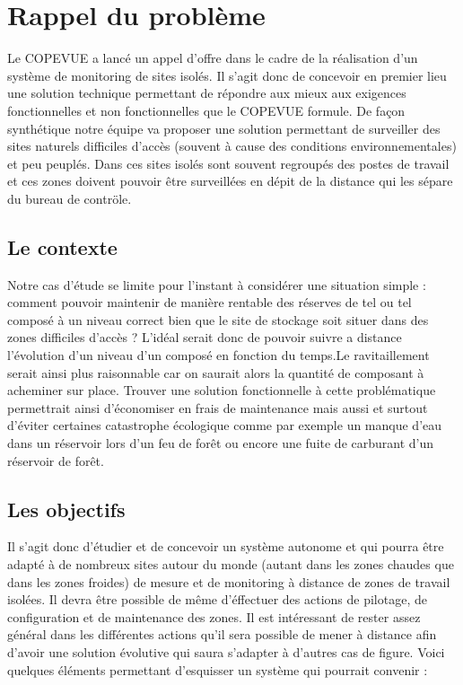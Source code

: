 \section{Rappel du problème}
Le COPEVUE a lancé un appel d'offre dans le cadre de la réalisation d'un système de monitoring de sites isolés. Il s'agit donc de concevoir en premier lieu une solution technique permettant de répondre aux mieux aux exigences fonctionnelles et non fonctionnelles que le COPEVUE formule. De façon synthétique notre équipe va proposer une solution permettant de surveiller des sites naturels difficiles d'accès (souvent à cause des conditions environnementales) et peu peuplés. Dans ces sites isolés sont souvent regroupés des postes de travail et ces zones doivent pouvoir être surveillées en dépit de la distance qui les sépare du bureau de contröle.
\subsection{Le contexte}
Notre cas d'étude se limite pour l'instant à considérer une situation simple : comment pouvoir maintenir de manière rentable des réserves de tel ou tel composé à un niveau correct bien que le site de stockage soit situer dans des zones difficiles d'accès ? L'idéal serait donc de pouvoir suivre a distance l'évolution d'un niveau d'un composé en fonction du temps.Le ravitaillement serait ainsi plus raisonnable car on saurait alors la quantité de composant à acheminer sur place. Trouver une solution fonctionnelle à cette problématique permettrait ainsi d'économiser en frais de maintenance mais aussi et surtout d'éviter certaines catastrophe écologique comme par exemple un manque d'eau dans un réservoir lors d'un feu de forêt ou encore une fuite de carburant d'un réservoir de forêt.

\subsection{Les objectifs}
Il s'agit donc d'étudier et de concevoir un système autonome et qui pourra être adapté à de nombreux sites autour du monde (autant dans les zones chaudes que dans les zones froides) de mesure et de monitoring à distance de zones de travail isolées. Il devra être possible de même d'éffectuer des actions de pilotage, de configuration et de maintenance des zones. Il est intéressant de rester assez général dans les différentes actions qu'il sera possible de mener à distance afin d'avoir une solution évolutive qui saura s'adapter à d'autres cas de figure.
Voici quelques éléments permettant d'esquisser un système qui pourrait convenir :

